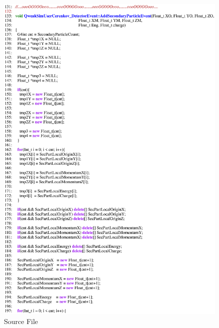 \clearpage

\begin{figure}[ht]
  \hspace{0cm}
  \includegraphics[scale=0.8]{./figures5/QweakSimUserCerenkov_DetectorEvent.cc-p3.eps}
  \caption{\label{SourceV38} Source File}
           \label{fig:V-SC-41}
\end{figure}

\clearpage

